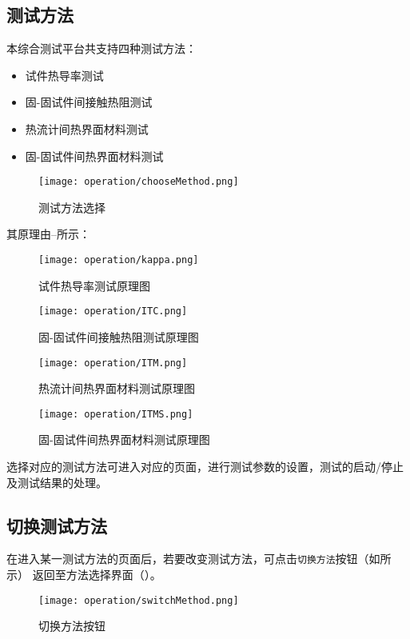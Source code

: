 \subsection{测试方法\label{subsec:testMethods}}
本综合测试平台共支持四种测试方法：
\begin{itemize}
    \item 试件热导率测试
    \item 固-固试件间接触热阻测试
    \item 热流计间热界面材料测试
    \item 固-固试件间热界面材料测试
\end{itemize}
\begin{figure}[htbp]
    \centering
    \texttt{[image: operation/chooseMethod.png]}
    \caption{ 测试方法选择 \label{fig:chooseMethod}}
\end{figure}
其原理由--所示：
\begin{figure}[H]
    \centering
    \texttt{[image: operation/kappa.png]}
    \caption{ 试件热导率测试原理图 \label{fig:kappa}}
\end{figure}
\begin{figure}[H]
    \centering
    \texttt{[image: operation/ITC.png]}
    \caption{ 固-固试件间接触热阻测试原理图 \label{fig:ITC}}
\end{figure}
\begin{figure}[H]
    \centering
    \texttt{[image: operation/ITM.png]}
    \caption{ 热流计间热界面材料测试原理图 \label{fig:ITM}}
\end{figure}
\begin{figure}[H]
    \centering
    \texttt{[image: operation/ITMS.png]}
    \caption{ 固-固试件间热界面材料测试原理图 \label{fig:ITMS}}
\end{figure}
选择对应的测试方法可进入对应的页面，进行测试参数的设置，测试的启动/停止及测试结果的处理。
\subsection{切换测试方法}
在进入某一测试方法的页面后，若要改变测试方法，可点击\lstinline{切换方法}按钮（如所示）
返回至方法选择界面（）。
\begin{figure}[htbp]
    \centering
    \texttt{[image: operation/switchMethod.png]}
    \caption{ 切换方法按钮 \label{fig:btnSwitchMethod}}
\end{figure}

